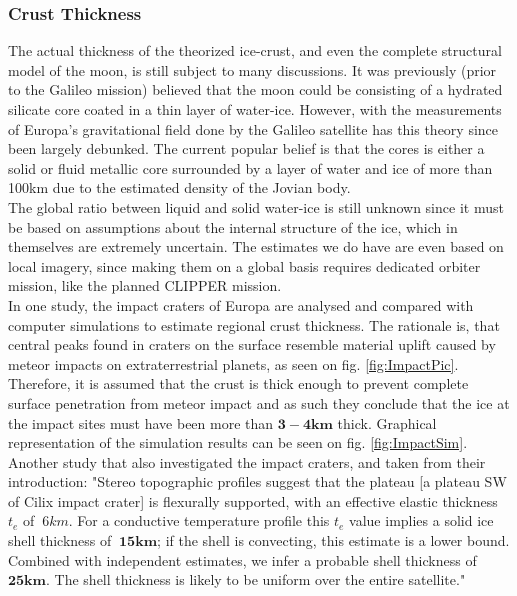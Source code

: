 \subsubsection{Crust Thickness}
The actual thickness of the theorized ice-crust, and even the complete structural model of the moon, is still subject to many discussions. It was previously (prior to the Galileo mission) believed that the moon could be consisting of a hydrated silicate core coated in a thin layer of water-ice. However, with the measurements of Europa's gravitational field done by the Galileo satellite has this theory since been largely debunked. The current popular belief is that the cores is either a solid or fluid metallic core surrounded by a layer of water and ice of more than 100km due to the estimated density of the Jovian body. \\
The global ratio between liquid and solid water-ice is still unknown since it must be based on assumptions about the internal structure of the ice, which in themselves are extremely uncertain. The estimates we do have are even based on local imagery, since making them on a global basis requires dedicated orbiter mission, like the planned CLIPPER mission.\\%
In one study, the impact craters of Europa are analysed and compared with computer simulations to estimate regional crust thickness. The rationale is, that central peaks found in craters on the surface resemble material uplift caused by meteor impacts on extraterrestrial planets\cite{ThickImpact}, as seen on fig. \ref{fig:ImpactPic}. Therefore, it is assumed that the crust is thick enough to prevent complete surface penetration from meteor impact and as such they conclude that the ice at the impact sites must have been more than 	$\mathbf{3-4km}$ thick. Graphical representation of the simulation results can be seen on fig. \ref{fig:ImpactSim}. Another study that also investigated the impact craters, and taken from their introduction: "Stereo topographic profiles suggest that the plateau [a plateau SW of Cilix impact crater] is
flexurally supported, with an effective elastic thickness $t_e$ of
$~6km$. For a conductive temperature profile this $t_e$ value
implies a solid ice shell thickness of $\mathbf{~15km}$; if the shell is
convecting, this estimate is a lower bound. Combined with
independent estimates, we infer a probable shell thickness
of $\mathbf{25 km}$. The shell thickness is likely to be uniform over
the entire satellite."\cite{ThermElast}
